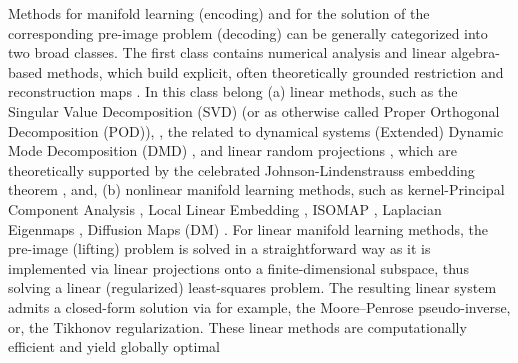\documentclass{article}
\begin{document}
Methods for manifold learning (encoding) and for the solution of the corresponding pre-image problem (decoding) can be generally categorized into two broad classes. The first class contains numerical analysis and linear algebra-based methods, which build explicit, often theoretically grounded restriction and reconstruction maps \cite{belkin2003laplacian,belkin2006convergence,coifman2005geometric,coifman2006geometric,belkin2008towards}. In this class belong (a) linear methods, such as the Singular Value Decomposition (SVD) (or as otherwise called Proper Orthogonal Decomposition (POD)), \cite{deane1991low,graham1996alternative,shvartsman1998nonlinear,rowley2004model,sirisup2005stability}, the related to dynamical systems (Extended) Dynamic Mode Decomposition (DMD) \cite{tu2014dynamic,li2017extended}, and linear random projections \cite{hegde2007random,halko2009finding,erichson2019randomized2}, which are theoretically supported by the celebrated Johnson-Lindenstrauss embedding theorem \cite{johnson1984extensions}, and, (b) nonlinear manifold learning methods, such as kernel-Principal Component Analysis \cite{scholkopf1998nonlinear}, Local Linear Embedding \cite{roweis2000nonlinear}, ISOMAP \cite{tenenbaum2000global}, Laplacian Eigenmaps \cite{belkin2003laplacian,belkin2008towards}, Diffusion Maps (DM) \cite{coifman2006diffusion,coifman2006geometric,nadler2006diffusion,coifman2008diffusion,dsilva2015data}.
For linear manifold learning methods, the pre-image (lifting) problem is solved in a straightforward way as it is implemented via linear projections onto a finite-dimensional subspace, thus solving a linear (regularized) least-squares problem. The resulting linear system admits a closed-form solution via for example, the Moore–Penrose pseudo-inverse, or, the Tikhonov regularization. These linear methods are computationally efficient and yield globally optimal
\end{document}
